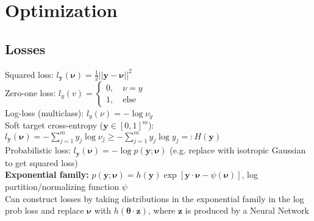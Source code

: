 \section*{Optimization}
\subsection*{Losses}
Squared loss: $l_\mathbf y(\pmb \nu)=\frac{1}{2}||\mathbf y -\pmb\nu||^2$\\
Zero-one loss: $l_y(v)=\begin{cases} 0, \quad \nu=y \\ 1, \quad \text{else}\end{cases}$\\
Log-loss (multiclass): $l_y(\nu)=-\log \nu_y$\\
Soft target cross-entropy ($\mathbf y\in[0,1]^m$): \\
$l_\mathbf y(\pmb \nu)=-\sum_{j=1}^my_j\log\nu_j\geq-\sum_{j=1}^my_j\log y_j=:H(\mathbf y)$\\
Probabilistic loss: $l_\mathbf y(\pmb\nu)=-\log p(\mathbf y;\pmb \nu)$ (e.g. replace with isotropic Gaussian to get squared loss)\\
\textbf{Exponential family:} $p(\mathbf y;\pmb\nu)=h(\mathbf y)\exp[\mathbf y\cdot\pmb\nu-\psi(\pmb\nu)]$, log partition/normalizing function $\psi$\\
Can construct losses by taking distributions in the exponential family in the log prob loss and replace $\pmb\nu$ with $h(\pmb\theta\cdot\mathbf z)$, where $\mathbf z$ is produced by a Neural Network

